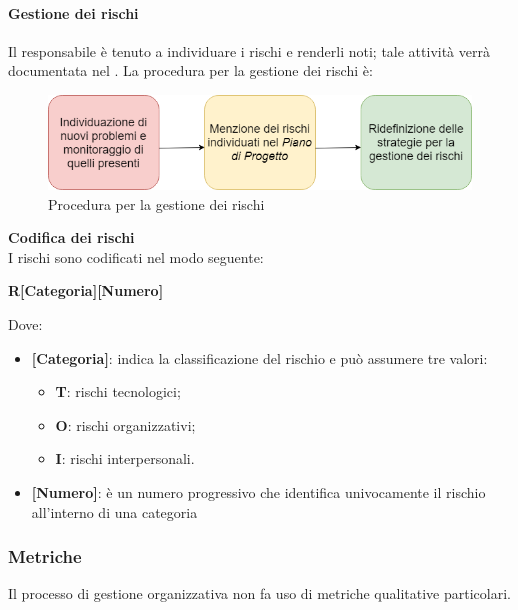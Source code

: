\paragraph{Gestione dei rischi}
Il responsabile è tenuto a individuare i rischi e renderli noti; tale attività verrà documentata nel \PdP{}. La procedura per la gestione dei rischi è: 
\begin{figure}[!htb]
     \centering
     \includegraphics[scale=0.5]{Images/GestioneRischi.png}
     \caption{Procedura per la gestione dei rischi}
\end{figure}

\mbox{}

\textbf{Codifica dei rischi} \\
I rischi sono codificati nel modo seguente: 
\begin{center}
\textbf{R[Categoria][Numero]}
\end{center}
Dove:
\begin{itemize}
	\item \textbf{[Categoria]}: indica la classificazione del rischio e può assumere tre valori:
	\begin{itemize}
		\item  \textbf{T}: rischi tecnologici; 
		\item \textbf{O}: rischi organizzativi;
		\item   \textbf{I}: rischi interpersonali.
	\end{itemize}
	\item \textbf{[Numero]}: è un numero progressivo che identifica univocamente il rischio all'interno di una categoria
\end{itemize}

\subsubsection{Metriche}
Il processo di gestione organizzativa non fa uso di metriche qualitative particolari.

